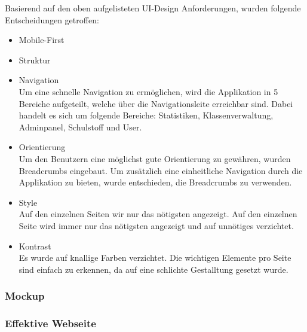 Basierend auf den oben aufgelisteten UI-Design Anforderungen, wurden folgende Entscheidungen getroffen:

\begin{itemize}
	\item Mobile-First \\
	
	\item Struktur \\
		
	\item Navigation \\
		Um eine schnelle Navigation zu ermöglichen, wird die Applikation in 5 Bereiche aufgeteilt, welche über die Navigationsleite erreichbar sind. Dabei handelt es sich um folgende Bereiche: Statistiken, Klassenverwaltung, Adminpanel, Schulstoff und User. 
	\item Orientierung \\
		Um den Benutzern eine möglichst gute Orientierung zu gewähren, wurden Breadcrumbs eingebaut. Um zusätzlich eine einheitliche Navigation durch die Applikation zu bieten, wurde entschieden, die Breadcrumbs zu verwenden.
	\item Style \\
		Auf den einzelnen Seiten wir nur das nötigsten angezeigt. Auf den einzelnen Seite wird immer nur das nötigsten angezeigt und auf unnötiges verzichtet.
	\item Kontrast \\
		Es wurde auf knallige Farben verzichtet. Die wichtigen Elemente pro Seite sind einfach zu erkennen, da auf eine schlichte Gestalltung gesetzt wurde.
\end{itemize}



\subsubsection*{Mockup}


\subsubsection*{Effektive Webseite}

\newpage